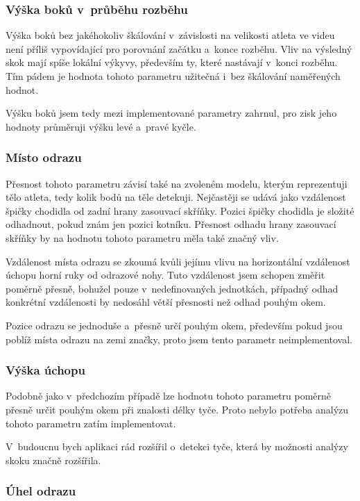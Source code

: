 \subsubsection{Výška boků v~průběhu rozběhu}

Výška boků bez jakéhokoliv škálování v~závislosti na velikosti atleta ve videu není příliš vypovídající pro porovnání začátku a~konce rozběhu. Vliv na výsledný skok mají spíše lokální výkyvy, především ty, které nastávají v~konci rozběhu. Tím pádem je hodnota tohoto parametru užitečná i~bez škálování naměřených hodnot.

Výšku boků jsem tedy mezi implementované parametry zahrnul, pro zisk jeho hodnoty průměruji výšku levé a~pravé kyčle.


\subsubsection{Místo odrazu}

Přesnost tohoto parametru závisí také na zvoleném modelu, kterým reprezentuji tělo atleta, tedy kolik bodů na těle detekuji. Nejčastěji se udává jako vzdálenost špičky chodidla od zadní hrany zasouvací skříňky. Pozici špičky chodidla je složité odhadnout, pokud znám jen pozici kotníku. Přesnost odhadu hrany zasouvací skříňky by na hodnotu tohoto parametru měla také značný vliv.

Vzdálenost místa odrazu se zkoumá kvůli jejímu vlivu na horizontální vzdálenost úchopu horní ruky od odrazové nohy. Tuto vzdálenost jsem schopen změřit poměrně přesně, bohužel pouze v~nedefinovaných jednotkách, případný odhad konkrétní vzdálenosti by nedosáhl větší přesnosti než odhad pouhým okem.

Pozice odrazu se jednoduše a~přesně určí pouhým okem, především pokud jsou poblíž místa odrazu na zemi značky, proto jsem tento parametr neimplementoval.


\subsubsection{Výška úchopu}

Podobně jako v~předchozím případě lze hodnotu tohoto parametru poměrně přesně určit pouhým okem při znalosti délky tyče. Proto nebylo potřeba analýzu tohoto parametru zatím implementovat.

V~budoucnu bych aplikaci rád rozšířil o~detekci tyče, která by možnosti analýzy skoku značně rozšířila.


\subsubsection{Úhel odrazu}

